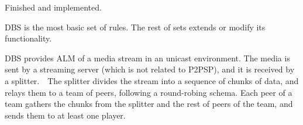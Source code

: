 
\label{sec:DBS}

\begin{notex}
  Finished and implemented.
\end{notex}

\acrshort{DBS} is the most basic set of rules. The rest of sets
extends or modify its functionality.

DBS provides \acrshort{ALM} of a \gls{media} \gls{stream} in an
\gls{unicast} environment. The media is sent by a streaming
\gls{server} (which is not related to P2PSP), and it
is received by a \gls{splitter}.~~The
splitter divides the stream into a sequence of \gls{chunk}s of data,
and relays them to a \gls{team} of peers, following a round-robing
schema. Each peer of a team gathers the chunks from the splitter and
the rest of peers of the team, and sends them to at least one
\gls{player}.

\begin{comment}
In single layered streams\footnote{Each layer of a
  scalable stream is received by a different peer attached to the same
  player capable or render scalable media.}, each peer is spawned by a
player (normal users should not run peers directly).
\end{comment}

\begin{comment}
/* quitar: We define the set of teams as
$\{T\}$,
and enumerate the peers in the team $T$ as $T=\{P_1,\cdots,P_{|T|}\}$. */
\end{comment}
